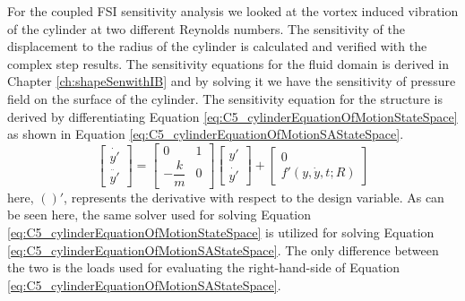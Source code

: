 For the coupled FSI sensitivity analysis we looked at the vortex induced vibration of the cylinder at two different Reynolds numbers. The sensitivity of the displacement to the radius of the cylinder is calculated and verified with the complex step results. The sensitivity equations for the fluid domain is derived in Chapter \ref{ch:shapeSenwithIB} and by solving it we have the sensitivity of pressure field on the surface of the cylinder. The sensitivity equation for the structure is derived by differentiating Equation \eqref{eq:C5_cylinderEquationOfMotionStateSpace} as shown in Equation \eqref{eq:C5_cylinderEquationOfMotionSAStateSpace}.
%
\begin{equation}\label{eq:C5_cylinderEquationOfMotionSAStateSpace}
	\begin{bmatrix}
	\dot{y'} \\
	\ddot{y'}
	\end{bmatrix} = 
	\begin{bmatrix}
	0 & 1 \\
	-\dfrac{k}{m} & 0
	\end{bmatrix}
	\begin{bmatrix}
	y' \\
	\dot{y'}
	\end{bmatrix} + 
	\begin{bmatrix}
	0 \\
	f'(y, \dot{y}, t; R)
	\end{bmatrix}
\end{equation}
%
here, $()'$, represents the derivative with respect to the design variable. As can be seen here, the same solver used for solving Equation \eqref{eq:C5_cylinderEquationOfMotionStateSpace} is utilized for solving Equation \eqref{eq:C5_cylinderEquationOfMotionSAStateSpace}. The only difference between the two is the loads used for evaluating the right-hand-side of Equation \eqref{eq:C5_cylinderEquationOfMotionSAStateSpace}.

